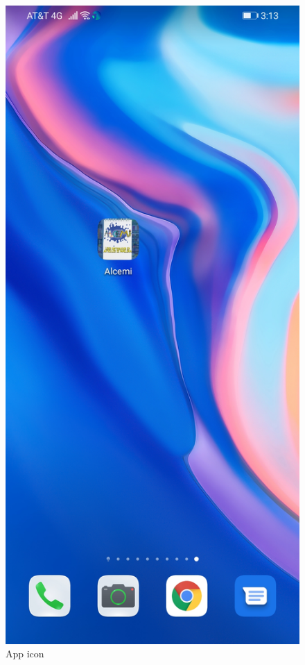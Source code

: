 \documentclass{article}
\begin{document}
\begin{figure}[h]
\begin{minipage}[t]{0.5\linewidth}
\caption {App icon}
\centering
\includegraphics[scale=0.16]{fig10}
\end{minipage}

\end{figure}
\end{document}
